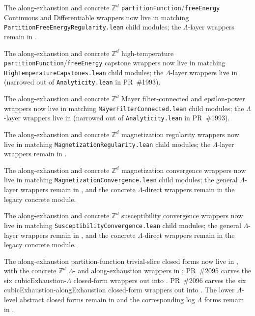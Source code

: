 \documentclass[a4paper,11pt]{article}
\begin{document}
The along-exhaustion and concrete $\mathbb{Z}^d$
\texttt{partitionFunction}/\texttt{freeEnergy} Continuous and Differentiable
wrappers now live in matching \texttt{PartitionFreeEnergyRegularity.lean}
child modules; the $\Lambda$-layer wrappers remain in
.

The along-exhaustion and concrete $\mathbb{Z}^d$ high-temperature
\texttt{partitionFunction}/\texttt{freeEnergy} capstone wrappers now live in
matching \texttt{HighTemperatureCapstones.lean} child modules; the
$\Lambda$-layer wrappers live in
(narrowed out of \texttt{Analyticity.lean} in PR~\#1993).

The along-exhaustion and concrete $\mathbb{Z}^d$ Mayer filter-connected and
epsilon-power wrappers now live in matching
\texttt{MayerFilterConnected.lean} child modules; the $\Lambda$-layer wrappers
live in
(narrowed out of \texttt{Analyticity.lean} in PR~\#1993).

The along-exhaustion and concrete $\mathbb{Z}^d$ magnetization regularity
wrappers now live in matching \texttt{MagnetizationRegularity.lean} child
modules; the $\Lambda$-layer wrappers remain in
.

The along-exhaustion and concrete $\mathbb{Z}^d$ magnetization convergence
wrappers now live in matching \texttt{MagnetizationConvergence.lean} child
modules; the general $\Lambda$-layer wrappers remain in
, and the concrete $\Lambda$-direct
wrappers remain in the legacy concrete module.

The along-exhaustion and concrete $\mathbb{Z}^d$ susceptibility convergence
wrappers now live in matching \texttt{SusceptibilityConvergence.lean} child
modules; the general $\Lambda$-layer wrappers remain in
, and the concrete $\Lambda$-direct
wrappers remain in the legacy concrete module.

{\raggedright
The along-exhaustion partition-function trivial-slice closed forms now live in
,
with the concrete $\mathbb{Z}^d$ $\Lambda$- and along-exhaustion
wrappers in
;
PR~\#2095 carves the six cubicExhaustion-$\Lambda$ closed-form wrappers
out into
.
PR~\#2096 carves the six cubicExhaustion-alongExhaustion closed-form
wrappers out into
.
The lower $\Lambda$-level abstract closed forms remain in
 and the corresponding log
$\Lambda$ forms remain in .
\par}
\end{document}

